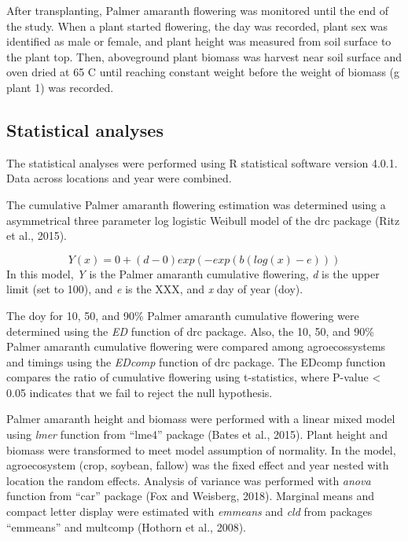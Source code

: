 \documentclass[utf8]{frontiersSCNS}
\begin{document}
After transplanting, Palmer amaranth flowering was monitored until the
end of the study. When a plant started flowering, the day was recorded,
plant sex was identified as male or female, and plant height was
measured from soil surface to the plant top. Then, aboveground plant
biomass was harvest near soil surface and oven dried at 65 C until
reaching constant weight before the weight of biomass (g plant 1) was
recorded.

\hypertarget{statistical-analyses}{%
\subsection*{Statistical analyses}\label{statistical-analyses}}

The statistical analyses were performed using R statistical software
version 4.0.1. Data across locations and year were combined.

The cumulative Palmer amaranth flowering estimation was determined using
a asymmetrical three parameter log logistic Weibull model of the drc
package (Ritz et al., 2015).

\[Y(x) = 0 + (d-0) exp (-exp(b(log(x)-e)))\] In this model, \emph{Y} is
the Palmer amaranth cumulative flowering, \emph{d} is the upper limit
(set to 100), and \emph{e} is the XXX, and \emph{x} day of year (doy).

The doy for 10, 50, and 90\% Palmer amaranth cumulative flowering were
determined using the \emph{ED} function of drc package. Also, the 10,
50, and 90\% Palmer amaranth cumulative flowering were compared among
agroecossystems and timings using the \emph{EDcomp} function of drc
package. The EDcomp function compares the ratio of cumulative flowering
using t-statistics, where P-value \textless{} 0.05 indicates that we
fail to reject the null hypothesis.

Palmer amaranth height and biomass were performed with a linear mixed
model using \emph{lmer} function from ``lme4'' package (Bates et al.,
2015). Plant height and biomass were transformed to meet model
assumption of normality. In the model, agroecosystem (crop, soybean,
fallow) was the fixed effect and year nested with location the random
effects. Analysis of variance was performed with \emph{anova} function
from ``car'' package (Fox and Weisberg, 2018). Marginal means and
compact letter display were estimated with \emph{emmeans} and \emph{cld}
from packages ``emmeans'' and multcomp (Hothorn et al., 2008).
\end{document}
